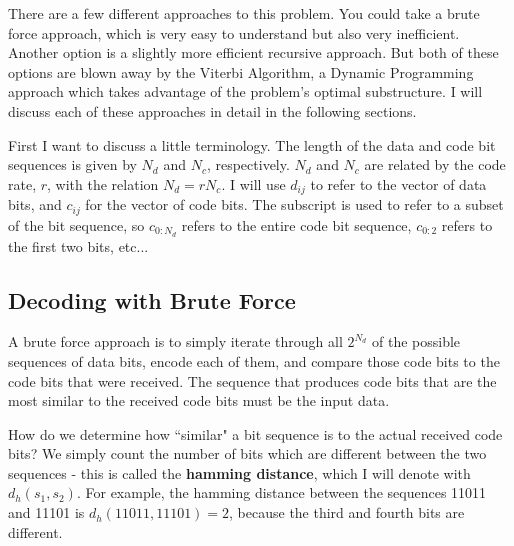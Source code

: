 \documentclass[11pt]{article}
\begin{document}
        There are a few different approaches to this problem.  You could take a
        brute force approach, which is very easy to understand but also very
        inefficient. Another option is a slightly more efficient recursive
        approach.  But both of these options are blown away by the Viterbi
        Algorithm, a Dynamic Programming approach which takes advantage of the
        problem's optimal substructure. I will discuss each of these approaches
        in detail in the following sections.

        First I want to discuss a little terminology.
        The length of the data and code bit sequences is given by $N_d$ and
        $N_c$, respectively. 
        $N_d$ and $N_c$ are related by the code rate, $r$, with the relation
        $N_d = rN_c$.
        I will use $d_{ij}$ to refer to the vector of data bits, and $c_{ij}$
        for the vector of code bits. The subscript is used to refer to a subset
        of the bit sequence, so $c_{0:N_d}$ refers to the entire code bit
        sequence, $c_{0:2}$ refers to the first two bits, etc...

        
        \subsection{Decoding with Brute Force}
        A brute force approach is to simply iterate through all $2^{N_d}$ of the
        possible sequences of data bits, encode each of them, and compare those code
        bits to the code bits that were received.  The sequence that produces
        code bits that are the most similar to the received code bits must be
        the input data.
        
        How do we determine how ``similar" a bit sequence is to the actual
        received code bits? We simply count the number of bits which are
        different between the two sequences - this is called the
        \textbf{hamming distance}, which I will denote with $d_h(s_1,s_2)$.  For
        example, the hamming distance between the sequences 11011 and 11101 is
        $d_h(11011, 11101) = 2$, because the third and fourth bits are different.
        
\end{document}
